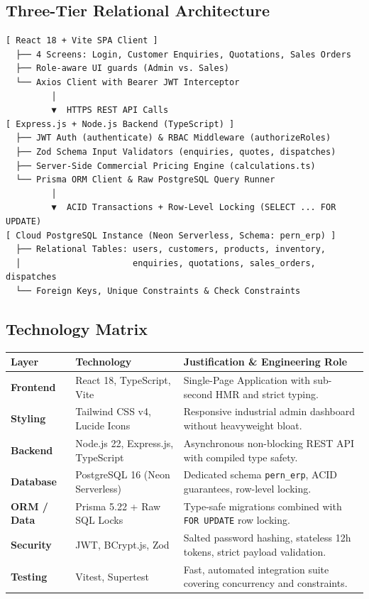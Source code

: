 \documentclass[11pt,a4paper]{article}
\begin{document}
\subsection{Three-Tier Relational Architecture}
\begin{center}
\begin{tcolorbox}[colback=lightgray,colframe=bordercolor,arc=2mm,width=\textwidth]
\begin{verbatim}
[ React 18 + Vite SPA Client ]
  ├── 4 Screens: Login, Customer Enquiries, Quotations, Sales Orders
  ├── Role-aware UI guards (Admin vs. Sales)
  └── Axios Client with Bearer JWT Interceptor
         │
         ▼  HTTPS REST API Calls
[ Express.js + Node.js Backend (TypeScript) ]
  ├── JWT Auth (authenticate) & RBAC Middleware (authorizeRoles)
  ├── Zod Schema Input Validators (enquiries, quotes, dispatches)
  ├── Server-Side Commercial Pricing Engine (calculations.ts)
  └── Prisma ORM Client & Raw PostgreSQL Query Runner
         │
         ▼  ACID Transactions + Row-Level Locking (SELECT ... FOR UPDATE)
[ Cloud PostgreSQL Instance (Neon Serverless, Schema: pern_erp) ]
  ├── Relational Tables: users, customers, products, inventory,
  │                      enquiries, quotations, sales_orders, dispatches
  └── Foreign Keys, Unique Constraints & Check Constraints
\end{verbatim}
\end{tcolorbox}
\end{center}

\subsection{Technology Matrix}
\begin{table}[htbp]
\centering
\small
\begin{tabularx}{\textwidth}{l l X}
\toprule
\textbf{Layer} & \textbf{Technology} & \textbf{Justification \& Engineering Role} \\
\midrule
\textbf{Frontend} & React 18, TypeScript, Vite & Single-Page Application with sub-second HMR and strict typing. \\
\textbf{Styling} & Tailwind CSS v4, Lucide Icons & Responsive industrial admin dashboard without heavyweight bloat. \\
\textbf{Backend} & Node.js 22, Express.js, TypeScript & Asynchronous non-blocking REST API with compiled type safety. \\
\textbf{Database} & PostgreSQL 16 (Neon Serverless) & Dedicated schema \texttt{pern\_erp}, ACID guarantees, row-level locking. \\
\textbf{ORM / Data} & Prisma 5.22 + Raw SQL Locks & Type-safe migrations combined with \texttt{FOR UPDATE} row locking. \\
\textbf{Security} & JWT, BCrypt.js, Zod & Salted password hashing, stateless 12h tokens, strict payload validation. \\
\textbf{Testing} & Vitest, Supertest & Fast, automated integration suite covering concurrency and constraints. \\
\bottomrule
\end{tabularx}
\end{table}
\end{document}
